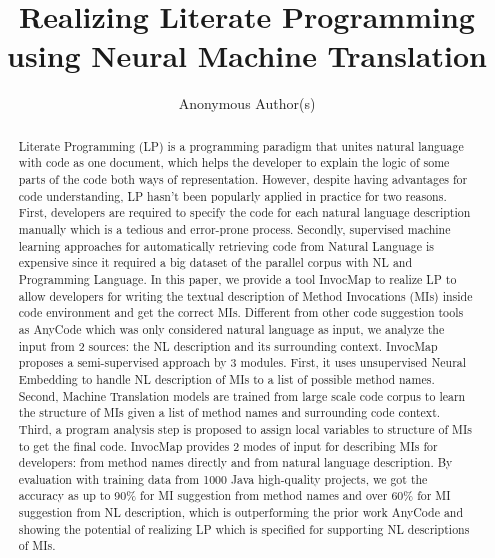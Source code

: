 \documentclass[sigconf,review,anonymous]{article}
\title{Realizing Literate Programming using Neural Machine Translation}
\author{%
  Anonymous Author(s)
}
\begin{document}
\maketitle

\begin{abstract}
Literate Programming (LP) is a programming paradigm that unites natural language with code as one document, which helps the developer to explain the logic of some parts of the code both ways of representation. However, despite having advantages for code understanding,  LP hasn't been popularly applied in practice for two reasons. First, developers are required to specify the code for each natural language description manually which is a tedious and error-prone process. Secondly, supervised machine learning approaches for automatically retrieving code from Natural Language is expensive since it required a big dataset of the parallel corpus with NL and Programming Language. In this paper, we provide a tool InvocMap to realize LP to allow developers for writing the textual description of Method Invocations (MIs) inside code environment and get the correct MIs. Different from other code suggestion tools as AnyCode which was only considered natural language as input, we analyze the input from 2 sources: the NL description and its surrounding context. InvocMap proposes a semi-supervised approach by 3 modules. First, it uses unsupervised Neural Embedding to handle NL description of MIs to a list of possible method names. Second, Machine Translation models are trained from large scale code corpus to learn the structure of MIs given a list of method names and surrounding code context. Third, a program analysis step is proposed to assign local variables to structure of MIs to get the final code. InvocMap provides 2 modes of input for describing MIs for developers: from method names directly and from natural language description. By evaluation with training data from 1000 Java high-quality projects, we got the accuracy as up to 90\% for MI suggestion from method names and over 60\% for MI suggestion from NL description, which is outperforming the prior work AnyCode and showing the potential of realizing LP which is specified for supporting NL descriptions of MIs.
\end{abstract}
\end{document}
